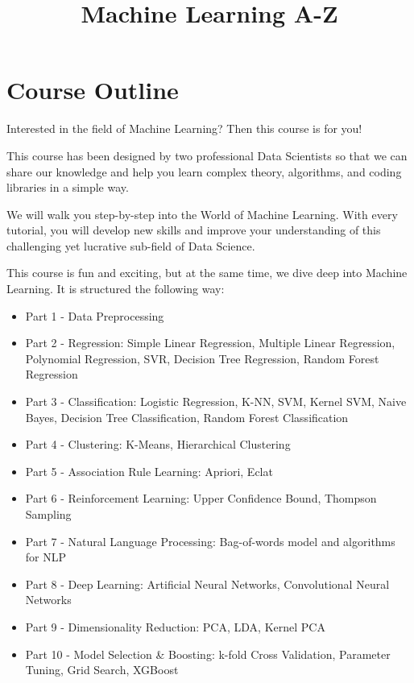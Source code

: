 \documentclass[
]{book}
\title{Machine Learning A-Z}
\author{}
\date{\vspace{-2.5em}}
\theoremstyle{definition}
\theoremstyle{definition}
\theoremstyle{definition}
\theoremstyle{definition}
\theoremstyle{remark}
\begin{document}
\maketitle

{
\setcounter{tocdepth}{1}
\tableofcontents
}
\hypertarget{course-outline}{%
\chapter*{Course Outline}\label{course-outline}}

Interested in the field of Machine Learning? Then this course is for you!

This course has been designed by two professional Data Scientists so that we can share our knowledge and help you learn complex theory, algorithms, and coding libraries in a simple way.

We will walk you step-by-step into the World of Machine Learning. With every tutorial, you will develop new skills and improve your understanding of this challenging yet lucrative sub-field of Data Science.

This course is fun and exciting, but at the same time, we dive deep into Machine Learning. It is structured the following way:

\begin{itemize}
\item
  Part 1 - Data Preprocessing
\item
  Part 2 - Regression: Simple Linear Regression, Multiple Linear Regression, Polynomial Regression, SVR, Decision Tree Regression, Random Forest Regression
\item
  Part 3 - Classification: Logistic Regression, K-NN, SVM, Kernel SVM, Naive Bayes, Decision Tree Classification, Random Forest Classification
\item
  Part 4 - Clustering: K-Means, Hierarchical Clustering
\item
  Part 5 - Association Rule Learning: Apriori, Eclat
\item
  Part 6 - Reinforcement Learning: Upper Confidence Bound, Thompson Sampling
\item
  Part 7 - Natural Language Processing: Bag-of-words model and algorithms for NLP
\item
  Part 8 - Deep Learning: Artificial Neural Networks, Convolutional Neural Networks
\item
  Part 9 - Dimensionality Reduction: PCA, LDA, Kernel PCA
\item
  Part 10 - Model Selection \& Boosting: k-fold Cross Validation, Parameter Tuning, Grid Search, XGBoost
\end{itemize}
\end{document}
